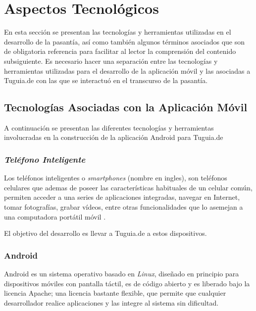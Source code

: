 \section{Aspectos Tecnológicos} \label{sect:aspectos_tecnologicos}

En esta sección se presentan las tecnologías y herramientas utilizadas en el desarrollo de la pasantía, así como también algunos términos asociados que son de obligatoria referencia para facilitar al lector la comprensión del contenido subsiguiente. Es necesario hacer una separación entre las tecnologías y herramientas utilizadas para el desarrollo de la aplicación móvil y las asociadas a Tuguia.de con las que se interactuó en el transcurso de la pasantía.

\subsection{Tecnologías Asociadas con la Aplicación Móvil} \label{subsect:Asociadas_movil}

A continuación se presentan las diferentes tecnologías y herramientas involucradas en la construcción de la aplicación Android para Tuguia.de 

\subsubsection{\textit{Teléfono Inteligente}}

Los teléfonos inteligentes o \textit{smartphones} (nombre en ingles), son teléfonos celulares que ademas de poseer las características habituales de un celular común, permiten acceder a una series de aplicaciones integradas, navegar en Internet, tomar fotografías, grabar vídeos, entre otras funcionalidades que lo asemejan  a una computadora portátil móvil \cite{PCM}.

El objetivo del desarrollo es llevar a Tuguia.de a estos dispositivos.

\subsubsection{Android}

Android es un sistema operativo basado en \textit{Linux}, diseñado en principio para dispositivos móviles con pantalla táctil, es de código abierto y es liberado bajo la licencia Apache; una licencia bastante flexible, que permite que cualquier desarrollador realice aplicaciones y las integre al sistema sin dificultad.

